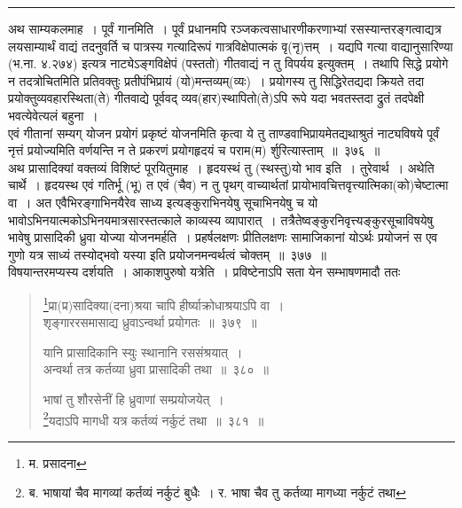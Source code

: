 \documentclass[11pt, openany]{book}
\begin{document}
\hrule

अथ साम्यकलमाह~। {\qtt पूर्वं गान}मिति~। पूर्वं प्रधानमपि रञ्जकत्वसाधारणीकरणाभ्यां रसस्यान्तरङ्गत्वाद्यत्र लयसाम्यार्थं वाद्यं तदनुवर्ति च पात्रस्य गत्यादिरूपं गात्रविक्षेपात्मकं वृ(नृ)त्तम्~। यद्यपि {\qtt गत्या वाद्यानुसारिण्या} (भ.ना. ४.२७४) इत्यत्र नाट्येऽङ्गविक्षेपं (पस्ततो) गीतवाद्यं न तु विपर्यय इत्युक्तम्~। तथापि सिद्धे प्रयोगे न तदत्रोचितमिति प्रतिवक्तुः प्रतीपंभिप्रायं (यो)मन्तव्यम्(व्यः)~। प्रयोगस्य तु सिद्धिरेतद्यदा क्रियते तदा प्रयोक्तुव्यवहारस्थिता(ते) गीतवाद्ये पूर्ववद् व्यव(हार)स्थापितो(ते)ऽपि रूपे यदा भवतस्तदा द्रुतं तदपेक्षी भवत्येवेत्यलं बहुना~।\\

एवं गीतानां सम्यग् योजन प्रयोगं प्रकृष्टं योजनमिति कृत्वा ये तु ताण्डवाभिप्रायमेतद्यथाश्रुतं नाट्यविषये पूर्वं नृत्तं प्रयोज्यमिति वर्णयन्ति न ते प्रकरणं प्रयोगहृदयं च पराम(म) र्शुरित्यास्ताम्~॥~३७६~॥\\

अथ प्रासादिक्यां वक्तव्यं विशिष्टं पूरयितुमाह~। हृदयस्थं तु (स्थस्तु)यो भाव इति~। {\qtt तुरेवार्थ}~। अथेति चार्थे~। हृदयस्थ एवं गतिर्भू (भू) त एवं (चैव) न तु पृथग् वाच्यार्थतां प्रायोभावचित्तवृत्त्यात्मिका(को)चेष्टात्मा वा~। अत एवैभिरङ्गाभिनयैरेव साध्य इत्यङ्कुराभिनयेषु सूचाभिनयेषु च यो भावोऽभिनयात्मकोऽभिनयमात्रसारस्तत्काले काव्यस्य व्यापारात्~। तत्रैतेष्वङ्कुरनिवृत्त्यङ्कुरसूचाविषयेषु भावेषु {\qtt प्रासादिकी} ध्रुवा योज्या योजनमर्हति~। प्रहर्षलक्षणः प्रीतिलक्षणः सामाजिकानां योऽर्थः प्रयोजनं स एव गुणो यत्र साध्यं तस्योद्भवो यस्या इति प्रयोजनमन्वर्थत्वं चोक्तम्~॥~३७७~॥\\

विषयान्तरमप्यस्य दर्शयति~। {\qtt आकाशपुरुषो} यत्रेति~। प्रविष्टेनाऽपि सता येन सम्भाषणमादौ ततः

\newpage

\begin{quote}
{\na \renewcommand{\thefootnote}{1}\footnote{म. प्रसादना}प्रा(प्र)सादिक्या(दना)श्रया चापि हीर्ष्याक्रोधाश्रयाऽपि वा~।\\
 शृङ्गाररसमासाद्य ध्रुवाऽन्वर्था प्रयोगतः~॥~३७९~॥

 यानि प्रासादिकानि स्युः स्थानानि रससंश्रयात्~।\\
 अन्वर्था तत्र कर्तव्या ध्रुवा प्रासादिकी तथा~॥~३८०~॥

 भाषां तु शौरसेनीं हि ध्रुवाणां सम्प्रयोजयेत्~।\\
 \renewcommand{\thefootnote}{2}\footnote{ब. भाषायां चैव मागव्यां कर्तव्यं नर्कुटं बुधैः~। र. भाषा चैव तु कर्तव्या मागध्या नर्कुटं तथा}यदाऽपि मागधी यत्र कर्तव्यं नर्कुटं तथा~॥~३८१~॥}
\end{quote}
\end{document}
